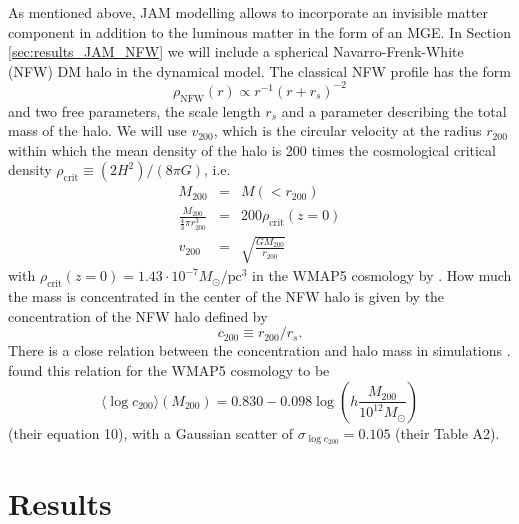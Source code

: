 \documentclass[useAMS,usenatbib]{mnras}
\begin{document}
As mentioned above, JAM modelling allows to incorporate an invisible matter component in addition to the luminous matter in the form of an MGE. In Section \ref{sec:results_JAM_NFW} we will include a spherical Navarro-Frenk-White (NFW) DM halo \citep{1996ApJ...462..563N} in the dynamical model. The classical NFW profile has the form
\begin{equation}
\rho_\text{NFW}(r) \propto r^{-1} \left( r+r_s \right)^{-2} \label{eq:NFWprofile}
\end{equation}
and two free parameters, the scale length $r_s$ and a parameter describing the total mass of the halo. We will use $v_\text{200}$, which is the circular velocity at the radius $r_\text{200}$ within which the mean density of the halo is 200 times the cosmological critical density $\rho_\text{crit} \equiv (2H^2)/(8\pi G)$, i.e.
\begin{eqnarray*}
M_\text{200} &=& M(<r_{200})\\
\frac{M_{200}}{ \frac 43 \pi r_{200}^3} &=& 200 \rho_\text{crit}(z=0) \\
v_\text{200} &=& \sqrt{\frac{GM_{200}}{r_\text{200}}}
\end{eqnarray*}
with $\rho_\text{crit}(z=0)=1.43 \cdot 10^{-7} M_\odot / \text{pc}^3$ in the WMAP5 cosmology by \citet{WMAP5cosm}. How much the mass is concentrated in the center of the NFW halo is given by the concentration of the NFW halo defined by 
\begin{equation}
c_{200}\equiv r_{200} / r_s. \label{eq:NFW_c}
\end{equation} 
There is a close relation between the concentration and halo mass in simulations \citep{1996ApJ...462..563N}. \citet{Maccio08} found this relation for the WMAP5 cosmology to be
\begin{equation}
\langle \log c_{200} \rangle (M_{200}) = 0.830 - 0.098 \log \left(h \frac{M_{200}}{10^{12} M_\odot} \right) \label{eq:Maccio08}
\end{equation}
(their equation 10), with a Gaussian scatter of $\sigma_{\log c_{200}} = 0.105$ (their Table A2). 

\section{Results} \label{sec:Results}
\end{document}
